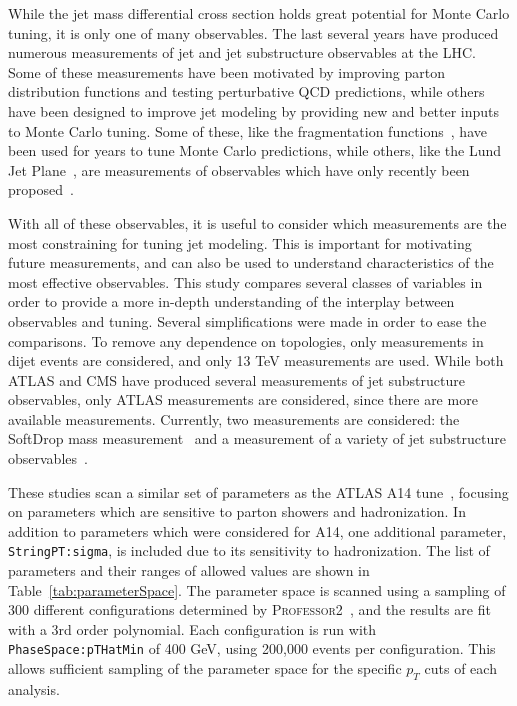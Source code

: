 While the jet mass differential cross section holds great potential for Monte Carlo tuning, it is only one of many observables.  The last several years have produced numerous measurements of jet and jet substructure observables at the LHC. 
Some of these measurements have been motivated by improving parton distribution functions and testing perturbative QCD predictions, 
while others have been designed to improve jet modeling by providing new and better inputs to Monte Carlo tuning.
Some of these, like the fragmentation functions~\cite{Aad:2019onw}, have been used for years to tune Monte Carlo predictions, 
while others, like the Lund Jet Plane~\cite{lundAtlas}, are measurements of observables which have only recently been proposed~\cite{lundPlane}.

With all of these observables, it is useful to consider which measurements are the most constraining for tuning jet modeling.
This is important for motivating future measurements, and can also be used to understand characteristics of the most effective observables.
This study compares several classes of variables in order to provide a more in-depth understanding of the interplay between observables and tuning.
Several simplifications were made in order to ease the comparisons. 
To remove any dependence on topologies, only measurements in dijet events are considered, and only 13 TeV measurements are used.
While both ATLAS and CMS have produced several measurements of jet substructure observables, only ATLAS measurements are considered, since there are more available measurements.
Currently, two measurements are considered: the SoftDrop mass measurement~\cite{Aaboud:2017qwh} and a measurement of a variety of jet substructure observables~\cite{Aaboud:2019aii}.


These studies scan a similar set of parameters as the ATLAS A14 tune~\cite{ATL-PHYS-PUB-2014-021}, focusing on parameters which are sensitive to parton showers and hadronization.
In addition to parameters which were considered for A14, one additional parameter, \texttt{StringPT:sigma}, is included due to its sensitivity to hadronization.
The list of parameters and their ranges of allowed values are shown in Table~\ref{tab:parameterSpace}.
The parameter space is scanned using a sampling of 300 different configurations determined by \textsc{Professor2}~\cite{Buckley:2009bj}, and the results are fit with a 3rd order polynomial.
Each configuration is run with \texttt{PhaseSpace:pTHatMin} of 400 GeV, using 200,000 events per configuration. 
This allows sufficient sampling of the parameter space for the specific $p_{T}$ cuts of each analysis. 

